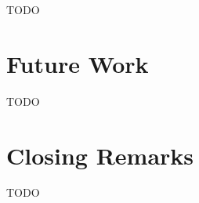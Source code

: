 TODO

\section{Future Work}
\label{sec:future_work}

TODO


\section{Closing Remarks}
\label{sec:closing_remarks}

TODO

